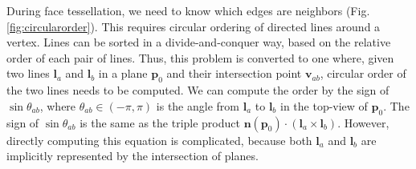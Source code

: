 \noindent During face tessellation, we need to know which edges are neighbors (Fig. \ref{fig:circularorder}).  This requires circular ordering of directed lines around a vertex. Lines can be sorted in a divide-and-conquer way, based on the relative order of each pair of lines. Thus, this problem is converted to one where, given two lines $\bm{l}_a$ and $\bm{l}_b$ in a plane $\bm{p}_0$ and their intersection point $\bm{v}_{ab}$, circular order of the two lines needs to be computed.
We can compute the order by the sign of $\sin{\theta_{ab}}$, where $\theta_{ab}\in(-\pi,\pi)$ is the angle from $\bm{l}_a$ to $\bm{l}_b$ in the top-view of $\bm{p}_0$. The sign of $\sin{\theta_{ab}}$ is the same as the triple product $\bm{n}(\bm{p}_0) \cdot (\bm{l}_a\times\bm{l}_b)$. However, directly computing this equation is complicated, because both $\bm{l}_a$ and $\bm{l}_b$ are implicitly represented by the intersection of planes.

